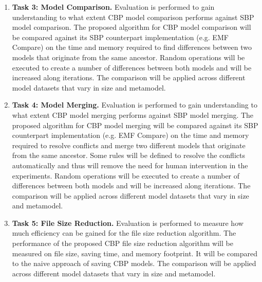 \documentclass[12pt, a4paper]{report} \usepackage[titletoc]{appendix}
\begin{document}
\begin{enumerate}
	\item \textbf{Task 3: Model Comparison.} Evaluation is performed to gain understanding to what extent CBP model comparison performs against SBP model comparison. The proposed algorithm for CBP model comparison will be compared against its SBP counterpart implementation (e.g. EMF Compare) on the time and memory required to find differences between two models that originate from the same ancestor. Random operations will be executed to create a number of differences between both models and will be increased along iterations. The comparison will be applied across different model datasets that vary in size and metamodel.   
	
	\item \textbf{Task 4: Model Merging.} Evaluation is performed to gain understanding to what extent CBP model merging performs against SBP model merging. The proposed algorithm for CBP model merging will be compared against its SBP counterpart implementation (e.g. EMF Compare) on the time and memory required to resolve conflicts and merge two different models that originate from the same ancestor. Some rules will be defined to resolve the conflicts automatically and thus will remove the need for human intervention in the experiments. Random operations will be executed to create a number of differences between both models and will be increased along iterations. The comparison will be applied across different model datasets that vary in size and metamodel.   
	
	\item \textbf{Task 5: File Size Reduction.} Evaluation is performed to measure how much efficiency can be gained for the file size reduction algorithm. The performance of the proposed CBP file size reduction algorithm will be measured on file size, saving time, and memory footprint. It will be compared to the naive approach of saving CBP models. The comparison will be applied across different model datasets that vary in size and metamodel.   
\end{enumerate}
\end{document}
